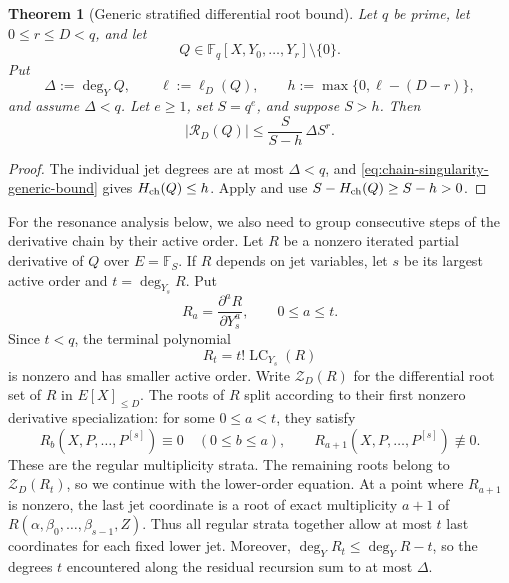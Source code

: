 \documentclass[11pt,letterpaper]{article}
\newtheorem{theorem}{Theorem}[section]
\theoremstyle{definition}
\newcommand{\F}{\mathbb{F}}
\begin{document}
\begin{theorem}[Generic stratified differential root bound]
\label{thm:root-bound-stratified}
Let \(q\) be prime, let \(0\le r\le D<q\), and let
\[
  Q\in\F_q[X,Y_0,\ldots,Y_r]\setminus\{0\}.
\]
Put
\begin{equation}
  \Delta:=\deg_Y Q,
  \qquad
  \ell:=\ell_D(Q),
  \qquad
  h:=\max\{0,\ell-(D-r)\},
  \label{eq:root-bound-parameters}
\end{equation}
and assume \(\Delta<q\).  Let \(e\ge1\), set \(S=q^e\), and suppose \(S>h\).
Then
\begin{equation}
  |\mathcal R_D(Q)|
  \le
  \frac{S}{S-h}\,\Delta S^r.
  \label{eq:sharpened-root-bound}
\end{equation}
\end{theorem}

\begin{proof}
The individual jet degrees are at most $\Delta<q$, and
\eqref{eq:chain-singularity-generic-bound} gives $H_{\rm ch}(Q)\le h$.
Apply  and use $S-H_{\rm ch}(Q)\ge S-h>0$.
\end{proof}

For the resonance analysis below, we also need to group consecutive
steps of the derivative chain by their active order. Let $R$ be a nonzero
iterated partial derivative of $Q$ over $E=\F_S$. If $R$ depends on jet
variables, let $s$ be its largest active order and $t=\deg_{Y_s}R$. Put
\begin{equation}
 R_a=\frac{\partial^aR}{\partial Y_s^a},\qquad 0\le a\le t.
 \label{eq:partial-derivative-chain}
\end{equation}
Since $t<q$, the terminal polynomial
\begin{equation}
 R_t=t!\operatorname{LC}_{Y_s}(R)
 \label{eq:terminal-partial-derivative}
\end{equation}
is nonzero and has smaller active order. Write $\mathcal Z_D(R)$ for
the differential root set of $R$ in $E[X]_{\le D}$. The roots of $R$ split
according to their first nonzero derivative specialization: for some
$0\le a<t$, they satisfy
\begin{equation}
 R_b(X,P,\ldots,P^{[s]})\equiv0\quad(0\le b\le a),\qquad
 R_{a+1}(X,P,\ldots,P^{[s]})\not\equiv0.
 \label{eq:regular-stratum}
\end{equation}
These are the regular multiplicity strata. The remaining roots belong to
$\mathcal Z_D(R_t)$, so we continue with the lower-order equation.
At a point where $R_{a+1}$ is nonzero, the last jet coordinate is a root
of exact multiplicity $a+1$ of
$R(\alpha,\beta_0,\ldots,\beta_{s-1},Z)$. Thus all regular strata together
allow at most $t$ last coordinates for each fixed lower jet. Moreover,
$\deg_YR_t\le\deg_YR-t$, so the degrees $t$ encountered along the
residual recursion sum to at most $\Delta$.
\end{document}
